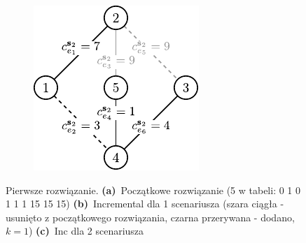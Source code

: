 \begin{figure}[!htbp]
\begin{subfigure}[b]{0.3\textwidth}
		\caption{}
		\label{fig:robincrexample:b}
	\end{subfigure}
	\hfill
	\begin{subfigure}[b]{0.3\textwidth}
		\includegraphics[width=\textwidth]{Chapter_II/ROB-INC-MST-example/c1}
		\caption{}
		\label{fig:robincrexample:c}
	\end{subfigure}
	\hfill\null
	\caption{
		Pierwsze rozwiązanie.
		\textbf{(a)}~Początkowe rozwiązanie (5 w tabeli: 0		1		0		1		1		1		15		15		15)
		\textbf{(b)}~Incremental dla 1 scenariusza (szara ciągła - usunięto z początkowego rozwiązania, czarna przerywana - dodano, $k=1$)
		\textbf{(c)}~Inc dla 2 scenariusza
	}
\end{figure}

